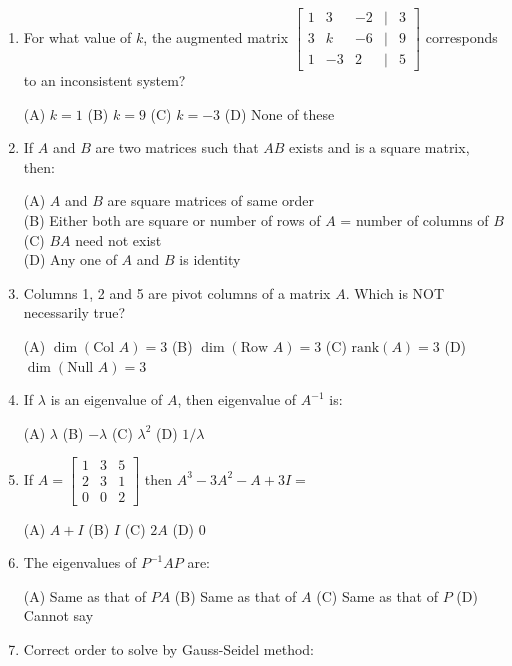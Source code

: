 \documentclass[11pt,a4paper]{article}
\begin{document}
\begin{enumerate}
\item For what value of $k$, the augmented matrix $\begin{bmatrix} 1 & 3 & -2 & | & 3 \\ 3 & k & -6 & | & 9 \\ 1 & -3 & 2 & | & 5 \end{bmatrix}$ corresponds to an inconsistent system?

(A) $k = 1$ \quad (B) $k = 9$ \quad (C) $k = -3$ \quad (D) None of these

\item If $A$ and $B$ are two matrices such that $AB$ exists and is a square matrix, then:

(A) $A$ and $B$ are square matrices of same order\\
(B) Either both are square or number of rows of $A$ = number of columns of $B$\\
(C) $BA$ need not exist\\
(D) Any one of $A$ and $B$ is identity

\item Columns 1, 2 and 5 are pivot columns of a matrix $A$. Which is NOT necessarily true?

(A) $\dim(\text{Col } A) = 3$ \quad (B) $\dim(\text{Row } A) = 3$ \quad (C) $\text{rank}(A) = 3$ \quad (D) $\dim(\text{Null } A) = 3$

\item If $\lambda$ is an eigenvalue of $A$, then eigenvalue of $A^{-1}$ is:

(A) $\lambda$ \quad (B) $-\lambda$ \quad (C) $\lambda^2$ \quad (D) $1/\lambda$

\item If $A = \begin{bmatrix} 1 & 3 & 5 \\ 2 & 3 & 1 \\ 0 & 0 & 2 \end{bmatrix}$ then $A^3 - 3A^2 - A + 3I =$

(A) $A + I$ \quad (B) $I$ \quad (C) $2A$ \quad (D) $0$

\item The eigenvalues of $P^{-1}AP$ are:

(A) Same as that of $PA$ \quad (B) Same as that of $A$ \quad (C) Same as that of $P$ \quad (D) Cannot say

\item Correct order to solve by Gauss-Seidel method:


\end{enumerate}
\end{document}
